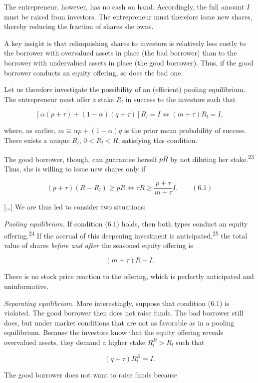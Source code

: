 \documentclass[11pt,a4paper]{article}
\begin{document}
The entrepreneur, however, has no cash on hand. Accordingly, the full amount \(I\) must be raised
from investors. The entrepreneur must therefore issue new shares, thereby reducing the fraction of
shares she owns.

A key insight is that relinquishing shares to investors is relatively less costly to the borrower
with overvalued assets in place (the bad borrower) than to the borrower with undervalued assets in
place (the good borrower). Thus, if the good borrower conducts an equity offering, so does the bad
one.

Let us therefore investigate the possibility of an (efficient) pooling equilibrium. The entrepreneur
must offer a stake \(R_l\) in success to the investors such that

\[[\alpha(p + \tau) + (1 - \alpha)(q + \tau)]R_l = I \iff (m + \tau)R_l = I,\]

where, as earlier, \(m \equiv \alpha p + (1 - \alpha)q\) is the prior mean probability of success.
There exists a unique \(R_l\), \(0 < R_l < R\), satisfying this condition.

The good borrower, though, can guarantee herself \(pR\) by not diluting her
stake.\textsuperscript{23} Thus, she is willing to issue new shares only if

\[(p + \tau)(R - R_l) \geqslant pR \iff \tau R \geqslant \frac{p + \tau}{m + \tau} I. \qquad (6.1)\]

{[}\ldots{]} We are thus led to consider two situations:

\emph{Pooling equilibrium.} If condition (6.1) holds, then both types conduct an equity
offering.\textsuperscript{24} If the accrual of this deepening investment is
anticipated,\textsuperscript{25} the total value of shares \emph{before and after} the seasoned
equity offering is

\[(m + \tau)R - I.\]

There is no stock price reaction to the offering, which is perfectly anticipated and uninformative.

\emph{Separating equilibrium.} More interestingly, suppose that condition (6.1) is violated. The
good borrower then does not raise funds. The bad borrower still does, but under market conditions
that are not as favorable as in a pooling equilibrium. Because the investors know that the equity
offering reveals overvalued assets, they demand a higher stake \(R_l^B > R_l\) such that

\[(q + \tau)R_l^B = I.\]

The good borrower does not want to raise funds because
\end{document}
